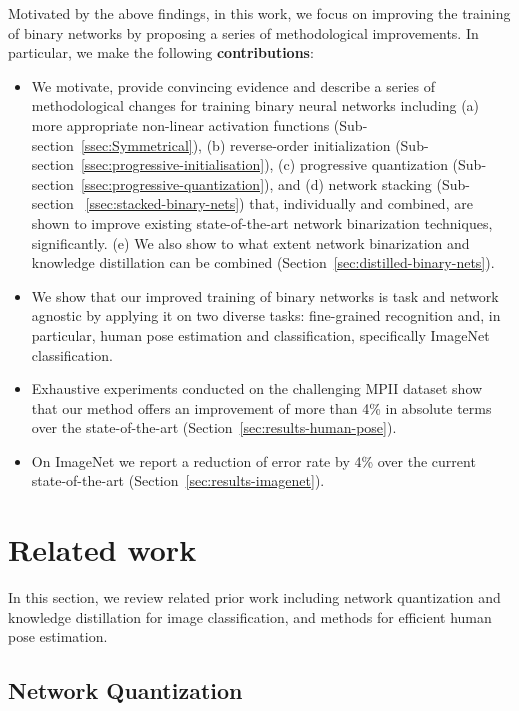 \documentclass[10pt,twocolumn,letterpaper]{article}
\begin{document}
Motivated by the above findings, in this work, we focus on improving the training of binary networks by proposing a series of methodological improvements. In particular, we make the following \textbf{contributions}: 
\begin{itemize}
    \item 
    We motivate, provide convincing evidence and describe a series of methodological changes for training binary neural networks including (a) more appropriate non-linear activation functions (Sub-section~\ref{ssec:Symmetrical}), (b) reverse-order initialization  (Sub-section~\ref{ssec:progressive-initialisation}), (c) progressive quantization (Sub-section~\ref{ssec:progressive-quantization}), and (d) network stacking (Sub-section~ \ref{ssec:stacked-binary-nets}) that, individually and combined, are shown to improve existing state-of-the-art network binarization techniques, significantly. (e) We also show to what extent network binarization and knowledge distillation can be combined (Section~\ref{sec:distilled-binary-nets}).
    \item 
    We show that our improved training of binary networks is task and network agnostic by applying it on two diverse tasks: fine-grained recognition and, in particular, human pose estimation and classification, specifically ImageNet classification.
     \item 
    Exhaustive experiments conducted on the challenging MPII dataset show that our method offers an improvement of more than 4\% in absolute terms over the state-of-the-art (Section~\ref{sec:results-human-pose}). 
    \item 
    On ImageNet we report a reduction of error rate by 4\%  over the current state-of-the-art (Section~\ref{sec:results-imagenet}). 
\end{itemize}



\section{Related work}\label{sec:related-work}
In this section, we review related prior work including network quantization and knowledge distillation for image classification, and methods for efficient human pose estimation.



\subsection{Network Quantization}\label{ssec:related-network-quantization}
\end{document}
